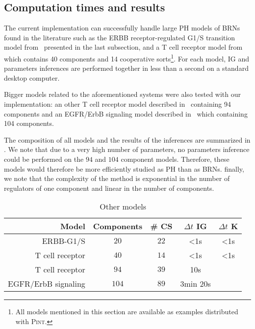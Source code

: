 \subsection{Computation times and results}\label{ssec:cpu}

The current implementation can successfully handle large PH models of BRNs found in the literature
such as the ERBB receptor-regulated G1/S transition model from~\cite{Sahin09} presented in the last subsection,
and a T cell receptor model from~\cite{Klamt06} which contains 40 components and 14 cooperative
sorts\footnote{All models mentioned in this section are available as examples distributed with \textsc{Pint}.}.
For each model, IG and parameters inferences are performed together in less than a second
on a standard desktop computer.

Bigger models related to the aforementioned systems were also tested with our implementation:
an other T cell receptor model described in~\cite{SaezRodriguez2007} containing 94 components
and an EGFR/ErbB signaling model described in~\cite{Samaga2009} which containing 104 components.

The composition of all models and the results of the inferences are summarized in .
We note that due to a very high number of parameters, no parameters inference could be performed on the $94$ and $104$ component models.
Therefore, these models would therefore be more efficiently studied as PH than as BRNs.
finally, we note that the complexity of the method is exponential in the number of regulators of one
component and linear in the number of components.

\begin{table}
\begin{center}
  \begin{tabular}{r|c|c|c|c}
    \textbf{Model} & \textbf{Components} & \textbf{\# CS} & \textbf{$\Delta t$ IG} & \textbf{$\Delta t$ K}
\\\hline\hline
    ERBB-G1/S & $20$ & $22$ & <1s & <1s
\\\hline
    T cell receptor & $40$ & $14$ & <1s & <1s
\\\hline
    T cell receptor & $94$ & $39$ & 10s & 
\\\hline
    EGFR/ErbB signaling & $104$ & $89$ & 3min 20s & 
  \end{tabular}
\end{center}
  \caption{Other models }
  \label{tb:computation}
\end{table}



